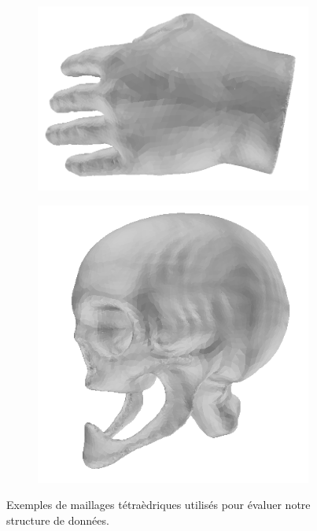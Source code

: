 \begin{figure}[th]
\begin{subfigure}{.24\textwidth}
  \centering
  \includegraphics[scale=0.12]{Images/hand}
\end{subfigure}%
\begin{subfigure}{.24\textwidth}
  \centering
  \includegraphics[scale=0.14]{Images/skull}
\end{subfigure}
\caption{Exemples de maillages tétraèdriques utilisés pour évaluer notre structure de données.}
\label{fig:exemples_maillages}
\end{figure}

